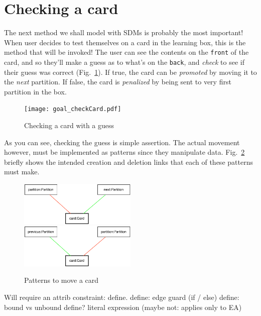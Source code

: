 \newpage
\section{Checking a card}
\genHeader
\hypertarget{sec:checkCard}{}

The next method we shall model with SDMs is probably the most important! When user decides to test themselves on a card in the learning box, this is the method
that will be invoked! The user can see the contents on the \texttt{front} of the card, and so they'll make a guess as to what's on the \texttt{back}, and
\emph{check} to see if their guess was correct (Fig.~\ref{fig:goal_check}). If true, the card can be \emph{promoted} by moving it to the \emph{next} partition.
If false, the card is \emph{penalized} by being sent to very first partition in the box.

\begin{figure}[htbp]
 	\centering
   \texttt{[image: goal\_checkCard.pdf]}
 	\caption{Checking a card with a guess}
 	\label{fig:goal_check}
\end{figure}
\FloatBarrier

As you can see, checking the guess is simple assertion. The actual movement however, must be implemented as patterns since they manipulate data.
Fig.~\ref{fig:patterns_check} briefly shows the intended creation and deletion links that each of these patterns must make.

\begin{figure}[htbp]
 	\centering
   \includegraphics[width=0.5\textwidth]{checkCard_promote.pdf}
   \\ \vspace{1cm}
    \includegraphics[width=0.5\textwidth]{checkCard_penalize.pdf}
 	\caption{Patterns to move a card}
 	\label{fig:patterns_check}
\end{figure}
\FloatBarrier

Will require an attrib constraint: define.
define: edge guard (if / else)
define: bound vs unbound
define? literal expression (maybe not: applies only to EA)




